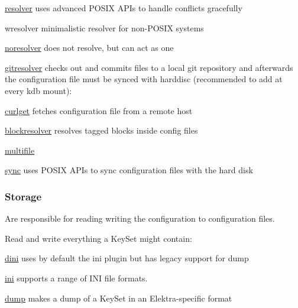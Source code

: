 \begin{DoxyItemize}
\item \hyperlink{md_src_plugins_resolver_README_src_plugins_resolver_README_md}{resolver} uses advanced P\+O\+S\+IX A\+P\+Is to handle conflicts gracefully
\item wresolver minimalistic resolver for non-\/\+P\+O\+S\+IX systems
\item \hyperlink{md_src_plugins_noresolver_README_src_plugins_noresolver_README_md}{noresolver} does not resolve, but can act as one
\item \hyperlink{md_src_plugins_gitresolver_README_src_plugins_gitresolver_README_md}{gitresolver} checks out and commits files to a local git repository and afterwards the configuration file must be synced with harddisc (recommended to add at every kdb mount)\+:
\item \hyperlink{md_src_plugins_curlget_README_src_plugins_curlget_README_md}{curlget} fetches configuration file from a remote host
\item \hyperlink{md_src_plugins_blockresolver_README_src_plugins_blockresolver_README_md}{blockresolver} resolves tagged blocks inside config files
\item \hyperlink{md_src_plugins_multifile_README_src_plugins_multifile_README_md}{multifile}
\item \hyperlink{md_src_plugins_sync_README_src_plugins_sync_README_md}{sync} uses P\+O\+S\+IX A\+P\+Is to sync configuration files with the hard disk
\end{DoxyItemize}

\subsubsection*{Storage}

Are responsible for reading writing the configuration to configuration files.

Read and write everything a Key\+Set might contain\+:


\begin{DoxyItemize}
\item \hyperlink{md_src_plugins_dini_README_src_plugins_dini_README_md}{dini} uses by default the ini plugin but has legacy support for dump
\item \hyperlink{md_src_plugins_ini_README_src_plugins_ini_README_md}{ini} supports a range of I\+NI file formats.
\item \hyperlink{md_src_plugins_dump_README_src_plugins_dump_README_md}{dump} makes a dump of a Key\+Set in an Elektra-\/specific format
\end{DoxyItemize}

